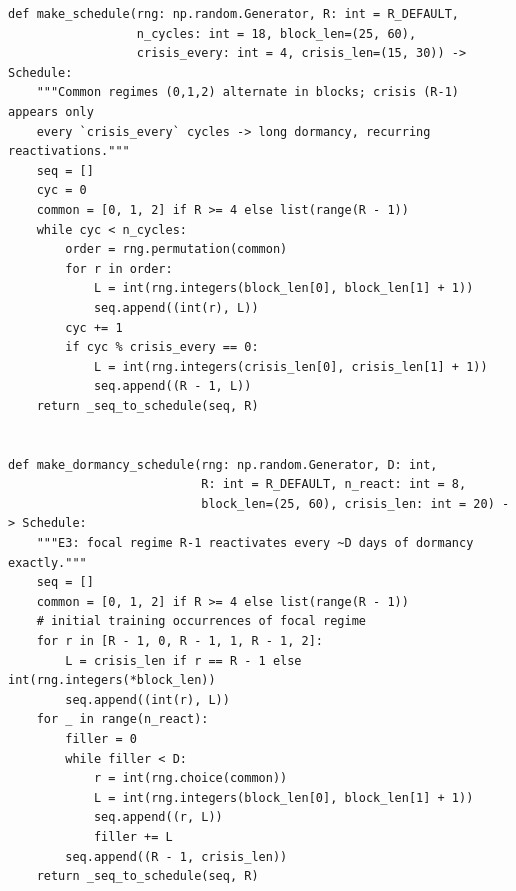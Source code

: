 \documentclass[11pt,a4paper]{article}
\theoremstyle{definition}
\theoremstyle{plain}
\begin{document}
\begin{lstlisting}[caption={Schedule builders and dormancy bookkeeping (\texttt{risp.py}).},label={lst:dd6-sched}]
def make_schedule(rng: np.random.Generator, R: int = R_DEFAULT,
                  n_cycles: int = 18, block_len=(25, 60),
                  crisis_every: int = 4, crisis_len=(15, 30)) -> Schedule:
    """Common regimes (0,1,2) alternate in blocks; crisis (R-1) appears only
    every `crisis_every` cycles -> long dormancy, recurring reactivations."""
    seq = []
    cyc = 0
    common = [0, 1, 2] if R >= 4 else list(range(R - 1))
    while cyc < n_cycles:
        order = rng.permutation(common)
        for r in order:
            L = int(rng.integers(block_len[0], block_len[1] + 1))
            seq.append((int(r), L))
        cyc += 1
        if cyc % crisis_every == 0:
            L = int(rng.integers(crisis_len[0], crisis_len[1] + 1))
            seq.append((R - 1, L))
    return _seq_to_schedule(seq, R)


def make_dormancy_schedule(rng: np.random.Generator, D: int,
                           R: int = R_DEFAULT, n_react: int = 8,
                           block_len=(25, 60), crisis_len: int = 20) -> Schedule:
    """E3: focal regime R-1 reactivates every ~D days of dormancy exactly."""
    seq = []
    common = [0, 1, 2] if R >= 4 else list(range(R - 1))
    # initial training occurrences of focal regime
    for r in [R - 1, 0, R - 1, 1, R - 1, 2]:
        L = crisis_len if r == R - 1 else int(rng.integers(*block_len))
        seq.append((int(r), L))
    for _ in range(n_react):
        filler = 0
        while filler < D:
            r = int(rng.choice(common))
            L = int(rng.integers(block_len[0], block_len[1] + 1))
            seq.append((r, L))
            filler += L
        seq.append((R - 1, crisis_len))
    return _seq_to_schedule(seq, R)
\end{lstlisting}
\end{document}
